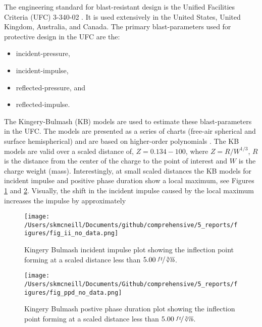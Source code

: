 The engineering standard for blast-resistant design is the Unified Facilities Criteria (UFC) 3-340-02 \cite{UFC3-340-02-2008}.  It is used extensively in the United States, United Kingdom, Australia, and Canada.   The primary blast-parameters used for protective design in the UFC are the:
\begin{itemize}
  \item incident-pressure,
  \item incident-impulse,
  \item reflected-pressure, and
  \item reflected-impulse.
\end{itemize}

The Kingery-Bulmash (KB) models are used to estimate these blast-parameters in the UFC.  The models are presented as a series of charts (free-air spherical and surface hemispherical) and are based on higher-order polynomials \cite{Kingery1984}.  The KB models are valid over a scaled distance of, $Z = 0.134 - 100$, where $Z=R/W^{1/3}$, $R$ is the distance from the center of the charge to the point of interest and $W$ is the charge weight (mass). Interestingly, at small scaled distances the KB models for incident impulse and positive phase duration show a local maximum, see Figures \ref{fig:KB_incident_impulse} and \ref{fig:KB_ppd}.  Visually, the shift in the incident impulse caused by the local maximum increases the impulse by approximately 

\begin{figure}[tb]
  \begin{center}
   \texttt{[image: /Users/skmcneill/Documents/github/comprehensive/5\_reports/figures/fig\_ii\_no\_data.png]}
  \end{center}
  \caption{Kingery Bulmash incident impulse plot showing the inflection point forming at a scaled distance less than $5.00\: \nicefrac{ft}{\sqrt[3]{lb}}$\citep{Kingery1984}.}
\label{fig:KB_incident_impulse}
\end{figure}%
   
\begin{figure}[tb]
  \begin{center}
   \texttt{[image: /Users/skmcneill/Documents/Github/comprehensive/5\_reports/figures/fig\_ppd\_no\_data.png]}
  \end{center}
  \caption{Kingery Bulmash postive phase duration plot showing the inflection point forming at a scaled distance less than $5.00\: \nicefrac{ft}{\sqrt[3]{lb}}$\citep{Kingery1984}.}
\label{fig:KB_ppd}
\end{figure}%


